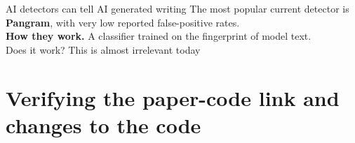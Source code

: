 \documentclass[aspectratio=169, 10pt]{beamer}
\begin{document}



\begin{frame}{AI detectors can tell AI generated writing}
\vskip0.1cm
The most popular current detector is \textbf{Pangram}, with very low reported false-positive rates.  \\
\bigskip 
\textbf{How they work.} A classifier trained on the fingerprint of model text. \\
\bigskip 
Does it work? This is almost irrelevant today 
\bigskip
\end{frame}



\section{Verifying the paper-code link and changes to the code}
\end{document}
